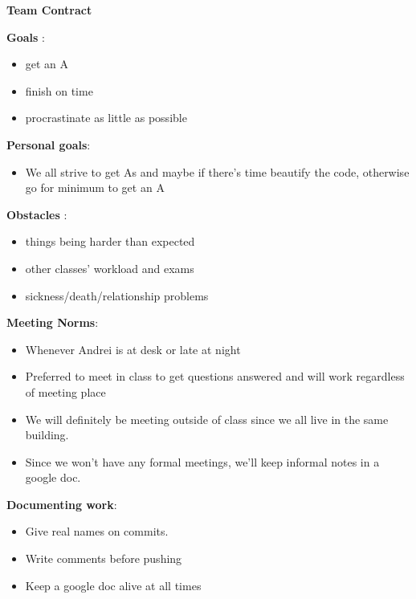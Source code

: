 \documentclass[12pt]{book}
\begin{document}
\phantom{xxx}
\bigskip
\centerline{{\large \bf Team Contract}}
\bigskip\bigskip


{\bf Goals} :
\begin{itemize}
\item get an A
\item finish on time
\item procrastinate as little as possible
\end{itemize}

\bigskip
{\bf Personal goals}:
\begin{itemize}
\item We all strive to get As and maybe if there’s time beautify the code, otherwise go for minimum to get an A
\end{itemize}

\bigskip

{\bf Obstacles} :
\begin{itemize}
\item things being harder than expected
\item other classes’ workload and exams
\item sickness/death/relationship problems
\end{itemize}

\bigskip

{\bf  Meeting Norms}:
\begin{itemize}
\item Whenever Andrei is at desk or late at night
\item Preferred to meet in class to get questions answered and will work regardless of meeting place
\item We will definitely be meeting outside of class since we all live in the same building.
\item Since we won’t have any formal meetings, we’ll keep informal notes in a google doc.
\end{itemize}


\bigskip
{\bf Documenting work}:
\begin{itemize}
\item Give real names on commits.
\item Write comments before pushing
\item Keep a google doc alive at all times
\end{itemize}
\end{document}
